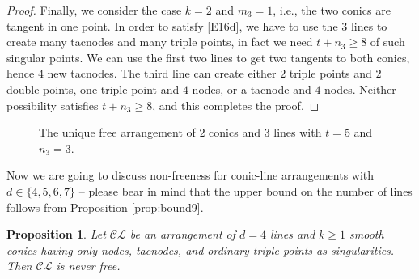 \documentclass[12pt]{amsart}
\theoremstyle{plain}
\newtheorem{prop}[subsection]{Proposition}
\theoremstyle{definition}
\numberwithin{equation}{section}
\begin{document}
\begin{proof}
Finally, we consider the case $k=2$ and $m_3=1$, i.e., the two conics are tangent in one point.  In order to satisfy \eqref{E16d}, we have to use the 3 lines to create many tacnodes and many triple points, in fact we need
$t+n_3 \geq 8$ of such singular points. We can use the first two lines to get two tangents to both conics, hence $4$ new tacnodes. The third line can create either $2$ triple points and $2$ double points, one triple point and $4$ nodes, or a tacnode and $4$ nodes. Neither possibility satisfies $t+n_3 \geq 8$, and this completes the proof.
\end{proof}
\begin{figure}[ht]
\begin{center}
\end{center}
\caption{The unique free arrangement of $2$ conics and $3$ lines with $t=5$ and $n_{3}=3$.}
\label{con-lin}
\end{figure}
Now we are going to discuss non-freeness for conic-line arrangements with $d \in \{4,5,6,7\}$ -- please bear in mind that the upper bound on the number of lines follows from Proposition \ref{prop:bound9}.
\begin{prop}
\label{prop11a}
Let $\mathcal{CL}$ be an arrangement of $d = 4$ lines and $k \geq 1$ smooth conics having only nodes, tacnodes, and ordinary triple points as singularities. Then $\mathcal{CL}$ is never free.
\end{prop}
\end{document}
